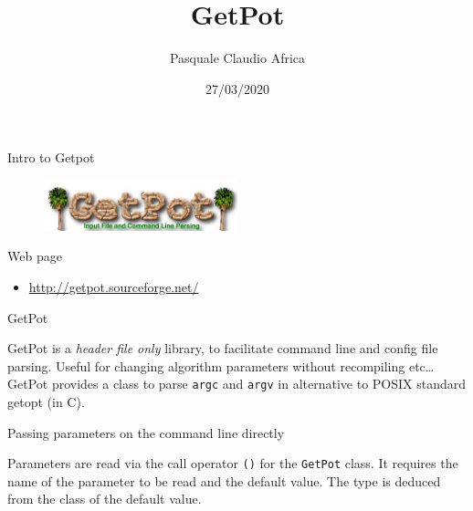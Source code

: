 \documentclass[10pt]{beamer}
\begin{document}
    \title{GetPot}
    \author{Pasquale Claudio Africa}
    \date{27/03/2020}

\begin{frame}
    \maketitle
\end{frame}

\begin{frame}{Intro to Getpot}
    \begin{figure}
        \centering
        \includegraphics[width=0.5\textwidth]{images/GetPotLogo2.jpg}
    \end{figure}

    \begin{block}{Web page}
        \centering
        \begin{itemize}
            \item \url{http://getpot.sourceforge.net/}
        \end{itemize}
    \end{block}

\end{frame}


\begin{frame}{GetPot}

    GetPot is a \emph{header file only} library,
    to facilitate command line and config file parsing.
    Useful for changing algorithm parameters without recompiling
     etc\ldots\\[1cm]

    GetPot provides a class to parse \texttt{argc} and \texttt{argv} in alternative to POSIX standard getopt (in C).

\end{frame}


\begin{frame}[fragile]{Passing parameters on the command line directly}

    

    Parameters are read via the call operator \texttt{()} for the \texttt{GetPot} class.
    It requires the name of the parameter to be read and the default value.
    The type is deduced from the class of the default value.

\end{frame}
\end{document}
